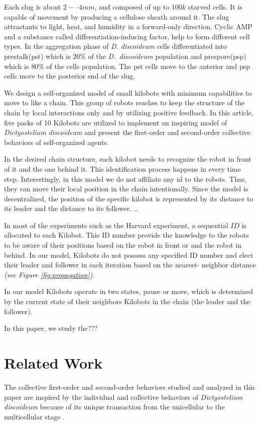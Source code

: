 \documentclass[11pt,a4paper]{article}
\begin{document}
Each slug is about $2-–4 mm$, and composed of up to $100k$ starved cells. It is capable of movement by producing a cellulose sheath around it. The slug attractants to light, heat, and humidity in a forward-only direction. Cyclic AMP and a substance called differentiation-inducing factor, help to form different cell types. In the aggregation phase of \textit{D. discoideum} cells differentiated into prestalk(pst) which is $20\%$ of the \textit{D.~discoideum} population and prespore(psp) which is $80\%$ of the cells population. The pst cells move to the anterior and psp cells move to the posterior end of the slug.

We design a self-organized model of small kilobots with minimum capabilities to move to like a chain. This group of robots reaches to keep the structure of the chain by local interactions only and by utilizing positive feedback.   In this article, five packs of 10 Kilobots are utilized to implement an inspiring model of \textit{Dictyostelium discoideum} and present the first-order and second-order collective behaviors of self-organized agents.  

In the desired chain structure, each kilobot needs to recognize the robot in front of it and the one behind it. This identification process happens in every time step. Interestingly, in this model we do not affiliate any id to the robots. Thus, they can move their local position in the chain intentionally. Since the model is decentralized, the position of the specific kilobot is represented by its distance to its leader and the distance to its follower. ..

In most of the experiments such as the Harvard experiment, a sequential $ID$  is allocated to each Kilobot. This ID number provide the knowledge to the robots to be aware of their positions based on the robot in front or and the robot in behind. In our model, Kilobots do not possess any specified ID number and elect their leader and follower in each iteration based on the nearest- neighbor distance \textit{(see Figure \ref{fig:propagation})}. 


In our model Kilobots operate in two states, pause or move, which is determined by the current state of their neighbors Kilobots in the chain (the leader and the follower). 

In this paper, we study the???
\section{Related Work} 
The collective first-order and second-order behaviors studied and analyzed in this paper are inspired by the individual and collective behaviors of \textit{Dictyostelium discoideum} because of its unique transaction from the unicellular to the multicellular stage \cite{loomis2012dictyostelium, maeda2005regulation}. 
\end{document}
